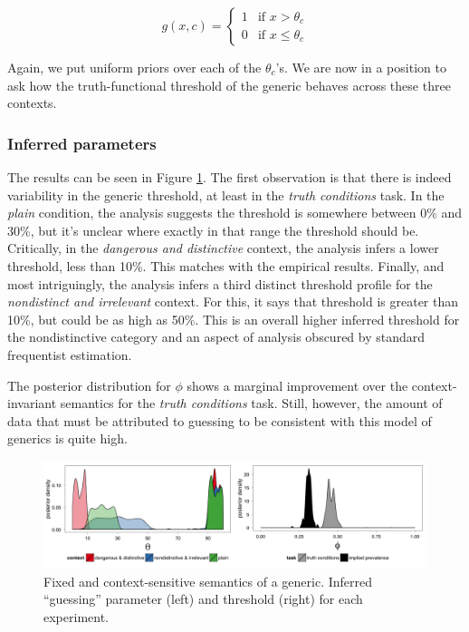 \documentclass[10pt,letterpaper]{article}
\begin{document}
\[
 g(x, c) =
  \begin{cases}
   1 & \text{if } x > \theta_{c} \\
   0       & \text{if } x \leq \theta_{c}
  \end{cases}
\]

Again, we put uniform priors over each of the $\theta_{c}$'s. We are now in a position to ask how the truth-functional threshold of the generic behaves across these three contexts. 

\subsubsection{Inferred parameters}

The results can be seen in Figure \ref{fig:justFixed}. The first observation is that there is indeed variability in the generic threshold, at least in the \emph{truth conditions} task. In the \emph{plain} condition, the analysis suggests the threshold is somewhere between 0\% and 30\%, but it's unclear where exactly in that range the threshold should be. Critically, in the \emph{dangerous and distinctive} context, the analysis infers a lower threshold, less than 10\%. This matches with the empirical results. Finally, and most intriguingly, the analysis infers a third distinct threshold profile for the \emph{nondistinct and irrelevant} context.  For this, it says that threshold is greater than 10\%, but could be as high as 50\%. This is an overall higher inferred threshold for the nondistinctive category and an aspect of analysis obscured by standard frequentist estimation. 

The posterior distribution for $\phi$ shows a marginal improvement over the context-invariant semantics for the \emph{truth conditions} task. Still, however, the amount of data that must be attributed to guessing to be consistent with this model of generics is quite high.


\begin{figure}
\centering
    \includegraphics[width=\columnwidth]{fixed_phis_thetas}
    \caption{Fixed and context-sensitive semantics of a generic. Inferred ``guessing'' parameter (left) and threshold (right) for each experiment.}
  \label{fig:justFixed}
\end{figure}
\end{document}
